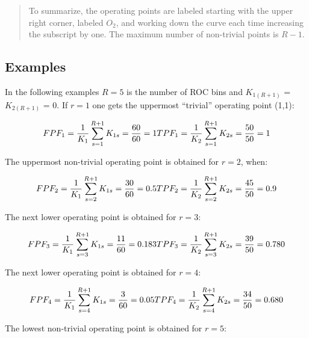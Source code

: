 \documentclass[
]{book}
\begin{document}
\begin{quote}
To summarize, the operating points are labeled starting with the upper right corner, labeled \(O_2\), and working down the curve each time increasing the subscript by one. The maximum number of non-trivial points is \(R-1\).
\end{quote}

\hypertarget{ratings-task-examples}{%
\subsection{Examples}\label{ratings-task-examples}}

In the following examples \(R = 5\) is the number of ROC bins and \(K_{1(R+1)}\) = \(K_{2(R+1)}\) = 0. If \(r = 1\) one gets the uppermost ``trivial'' operating point (1,1):

\begin{equation*} 
FPF_1=\frac {1} {K_1} \sum_{s=1}^{R+1}K_{1s} = \frac{60}{60} = 1\\
TPF_1=\frac {1} {K_2} \sum_{s=1}^{R+1}K_{2s} = \frac{50}{50} = 1
\end{equation*}

The uppermost non-trivial operating point is obtained for \(r = 2\), when:

\begin{equation*} 
FPF_2=\frac {1} {K_1} \sum_{s=2}^{R+1}K_{1s} = \frac{30}{60} = 0.5\\
TPF_2=\frac {1} {K_2} \sum_{s=2}^{R+1}K_{2s} = \frac{45}{50} = 0.9
\end{equation*}

The next lower operating point is obtained for \(r = 3\):

\begin{equation*} 
FPF_3=\frac {1} {K_1} \sum_{s=3}^{R+1}K_{1s} = \frac{11}{60} = 0.183\\
TPF_3=\frac {1} {K_2} \sum_{s=3}^{R+1}K_{2s} = \frac{39}{50} = 0.780
\end{equation*}

The next lower operating point is obtained for \(r = 4\):

\begin{equation*} 
FPF_4=\frac {1} {K_1} \sum_{s=4}^{R+1}K_{1s} = \frac{3}{60} = 0.05\\
TPF_4=\frac {1} {K_2} \sum_{s=4}^{R+1}K_{2s} = \frac{34}{50} = 0.680
\end{equation*}

The lowest non-trivial operating point is obtained for \(r = 5\):
\end{document}
